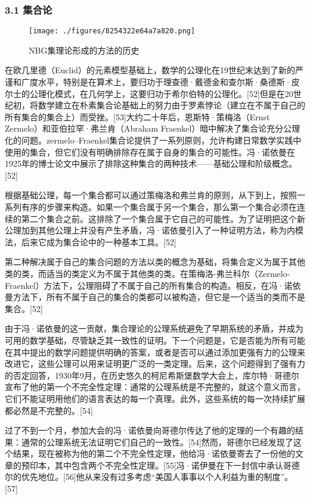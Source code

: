 \subsubsection{3.1 集合论}
\begin{figure}[ht]
\centering
\texttt{[image: ./figures/8254322e64a7a820.png]}
\caption{NBG集理论形成的方法的历史} \label{fig_von_4}
\end{figure}
在欧几里德（Euclid）的元素模型基础上，数学的公理化在19世纪末达到了新的严谨和广度水平，特别是在算术上，要归功于理查德·戴德金和查尔斯·桑德斯·皮尔士的公理化模式，在几何学上，这要归功于希尔伯特的公理化。[52]但是在20世纪初，将数学建立在朴素集合论基础上的努力由于罗素悖论（建立在不属于自己的所有集合的集合上）而受挫。[53]大约二十年后，恩斯特·策梅洛（Ernst Zermelo）和亚伯拉罕·弗兰肯（Abraham Fraenkel）暗中解决了集合论充分公理化的问题。zermelo–Fraenkel集合论提供了一系列原则，允许构建日常数学实践中使用的集合，但它们没有明确排除存在属于自身的集合的可能性。冯·诺依曼在1925年的博士论文中展示了排除这种集合的两种技术——基础公理和阶级概念。[52]

根据基础公理，每一个集合都可以通过策梅洛和弗兰肯的原则，从下到上，按照一系列有序的步骤来构造。如果一个集合属于另一个集合，那么第一个集合必须在连续的第二个集合之前。这排除了一个集合属于它自己的可能性。为了证明把这个新公理加到其他公理上并没有产生矛盾，冯·诺依曼引入了一种证明方法，称为内模法，后来它成为集合论中的一种基本工具。[52]

第二种解决属于自己的集合问题的方法以类的概念为基础，将集合定义为属于其他类的类，而适当的类定义为不属于其他类的类。在策梅洛-弗兰科尔（Zermelo-Fraenkel）方法下，公理阻碍了不属于自己的所有集合的构造。相反，在冯·诺依曼方法下，所有不属于自己的集合的类都可以被构造，但它是一个适当的类而不是集合。[52]

由于冯·诺依曼的这一贡献，集合理论的公理系统避免了早期系统的矛盾，并成为可用的数学基础，尽管缺乏其一致性的证明。下一个问题是，它是否能为所有可能在其中提出的数学问题提供明确的答案，或者是否可以通过添加更强有力的公理来改进它，这些公理可以用来证明更广泛的一类定理。后来，这个问题得到了强有力的否定回答，1930年9月，在历史悠久的柯尼希斯堡数学大会上，库尔特·哥德尔宣布了他的第一个不完全性定理：通常的公理系统是不完整的，就这个意义而言，它们不能证明用他们的语言表达的每一个真理。此外，这些系统的每一次持续扩展都必然是不完整的。[54]

过了不到一个月，参加大会的冯·诺依曼向哥德尔传达了他的定理的一个有趣的结果：通常的公理系统无法证明它们自己的一致性。[54]然而，哥德尔已经发现了这个结果，现在被称为他的第二个不完全性定理，他给冯·诺依曼寄去了一份他的文章的预印本，其中包含两个不完全性定理。[55]冯·诺伊曼在下一封信中承认哥德尔的优先地位。[56]他从来没有过多考虑“美国人事事以个人利益为重的制度”。[57]

